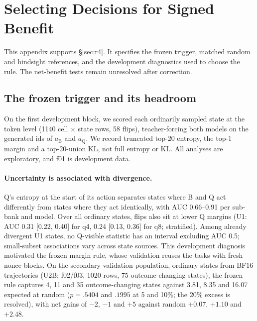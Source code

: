 \section{Selecting Decisions for Signed Benefit}
\label{app:r3}

This appendix supports \S\ref{sec:r4}. It specifies the frozen trigger, matched random and hindsight references, and the development diagnostics used to choose the rule. The net-benefit tests remain unresolved after correction.

\subsection{The frozen trigger and its headroom}
\label{app:token}
On the first development block, we scored each ordinarily sampled state at the token level (1140 cell $\times$ state rows, 58 flips), teacher-forcing both models on the generated ids of $a_{\mathrm{B}}$ and $a_{\mathrm{Q}}$. We record truncated top-20 entropy, the top-1 margin and a top-20-union KL, not full entropy or KL. All analyses are exploratory, and f01 is development data. %

\paragraph{Uncertainty is associated with divergence.} Q's entropy at the start of its action separates states where B and Q act differently from states where they act identically, with AUC 0.66--0.91 per sub-bank and model. Over all ordinary states, flips also sit at lower Q margins (U1: AUC 0.31 [0.22, 0.40] for q4, 0.24 [0.13, 0.36] for q8; stratified). %
Among already divergent U1 states, no Q-visible statistic has an interval excluding AUC 0.5; small-subset associations vary across state sources. This development diagnosis motivated the frozen margin rule, whose validation reuses the tasks with fresh nonce blocks. %
On the secondary validation population, ordinary states from BF16 trajectories (U2B; f02/f03, 1020 rows, 75 outcome-changing states), the frozen rule captures 4, 11 and 35 outcome-changing states against 3.81, 8.35 and 16.07 expected at random ($p=.5404$ and $.1995$ at 5 and 10\%; the 20\% excess is resolved), with net gains of $-2$, $-1$ and $+5$ against random $+0.07$, $+1.10$ and $+2.48$. %

